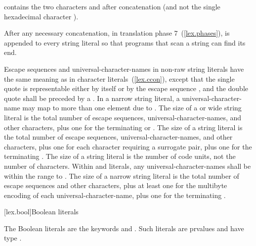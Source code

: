 contains the two characters  and 
after concatenation (and not the single hexadecimal character
).
\exitexample

\pnum
{}%
%
%
After any necessary concatenation, in translation phase
7~(\ref{lex.phases}),  is appended to every
string literal so that programs that scan a string can find its end.

\pnum
{}%
Escape sequences and universal-character-names in non-raw string literals
have the same meaning as in character literals~(\ref{lex.ccon}), except that
the single quote  is representable either by itself or by the escape sequence
, and the double quote  shall be preceded by a
\tcode{\textbackslash}.
%
In a narrow string literal, a universal-character-name may map to more
than one  element due to . The
size of a  or wide string literal is the total number of
escape sequences, universal-character-names, and other characters, plus
one for the terminating  or
. The size of a  string
literal is the total number of escape sequences,
universal-character-names, and other characters, plus one for each
character requiring a surrogate pair, plus one for the terminating
. \enternote The size of a 
string literal is the number of code units, not the number of
characters. \exitnote Within  and 
literals, any universal-character-names shall be within the range
 to . The size of a narrow string literal is
the total number of escape sequences and other characters, plus at least
one for the multibyte encoding of each universal-character-name, plus
one for the terminating .

[lex.bool]{Boolean literals}

%
\begin{bnf}
\br
    \br
\end{bnf}

\pnum
{}%
The Boolean literals are the keywords  and .
Such literals are prvalues and have type .

